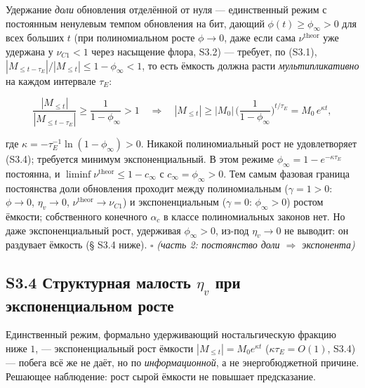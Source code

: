 \documentclass[12pt]{iopart}
\providecommand{\texorpdfstring}[2]{#1}
\begin{document}
Удержание \emph{доли} обновления отделённой от нуля --- единственный режим с постоянным ненулевым темпом обновления на бит, дающий \(\phi(t) \ge \phi_\infty > 0\) для всех больших \(t\) (при полиномиальном росте \(\phi \to 0\), даже если сама \(\nu^{\text{theor}}\) уже удержана у \(\nu_{C1} < 1\) через насыщение флора, S3.2) --- требует, по (S3.1), \(|M_{\le t-\tau_E}|/|M_{\le t}| \le 1 - \phi_\infty < 1\), то есть ёмкость должна расти \emph{мультипликативно} на каждом интервале \(\tau_E\):



\begin{equation}\frac{|M_{\le t}|}{|M_{\le t-\tau_E}|} \ge \frac{1}{1-\phi_\infty} > 1 \quad\Longrightarrow\quad |M_{\le t}| \ge |M_0|\,\Big(\frac{1}{1-\phi_\infty}\Big)^{t/\tau_E} = M_0\,e^{\kappa t}, \tag{S3.4}\end{equation}



где \(\kappa = -\tau_E^{-1}\ln(1-\phi_\infty) > 0\). Никакой полиномиальный рост не удовлетворяет (S3.4); требуется минимум экспоненциальный. В этом режиме \(\phi_\infty = 1 - e^{-\kappa\tau_E}\) постоянна, и \(\liminf\nu^{\text{theor}} \le 1 - c_\infty\) с \(c_\infty = \phi_\infty > 0\). Тем самым фазовая граница постоянства доли обновления проходит между полиномиальным (\(\gamma = 1 > 0\): \(\phi \to 0\), \(\eta_v \to 0\), \(\nu^{\text{theor}} \to \nu_{C1}\)) и экспоненциальным (\(\gamma = 0\): \(\phi_\infty > 0\)) ростом ёмкости; собственного конечного \(\alpha_c\) в классе полиномиальных законов нет. Но даже экспоненциальный рост, удерживая \(\phi_\infty > 0\), из-под \(\eta_v \to 0\) не выводит: он раздувает ёмкость (§ S3.4 ниже). \(\square\) \emph{(часть 2: постоянство доли \(\Rightarrow\) экспонента)}



\subsection{\texorpdfstring{S3.4 Структурная малость \(\eta_v\) при экспоненциальном росте}{S3.4 Структурная малость \textbackslash eta\_v при экспоненциальном росте}}\label{s3.4-ux441ux442ux440ux443ux43aux442ux443ux440ux43dux430ux44f-ux43cux430ux43bux43eux441ux442ux44c-eta_v-ux43fux440ux438-ux44dux43aux441ux43fux43eux43dux435ux43dux446ux438ux430ux43bux44cux43dux43eux43c-ux440ux43eux441ux442ux435}



Единственный режим, формально удерживающий ностальгическую фракцию ниже \(1\), --- экспоненциальный рост ёмкости \(|M_{\le t}| = M_0 e^{\kappa t}\) (\(\kappa\tau_E = O(1)\), S3.4) --- побега всё же не даёт, но по \emph{информационной}, а не энергобюджетной причине. Решающее наблюдение: рост сырой ёмкости не повышает предсказание.
\end{document}
